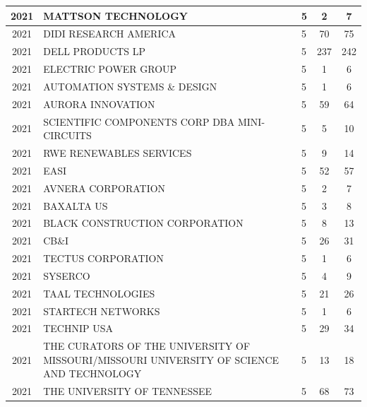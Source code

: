 \documentclass{article}%
\begin{document}
\begin{longtable}{c|p{20em}|p{5em}|c|c}
\hline%
2021&MATTSON TECHNOLOGY&5&2&7\\%
\hline%
2021&DIDI RESEARCH AMERICA&5&70&75\\%
\hline%
2021&DELL PRODUCTS LP&5&237&242\\%
\hline%
2021&ELECTRIC POWER GROUP&5&1&6\\%
\hline%
2021&AUTOMATION SYSTEMS \& DESIGN&5&1&6\\%
\hline%
2021&AURORA INNOVATION&5&59&64\\%
\hline%
2021&SCIENTIFIC COMPONENTS CORP DBA MINI{-}CIRCUITS&5&5&10\\%
\hline%
2021&RWE RENEWABLES SERVICES&5&9&14\\%
\hline%
2021&EASI&5&52&57\\%
\hline%
2021&AVNERA CORPORATION&5&2&7\\%
\hline%
2021&BAXALTA US&5&3&8\\%
\hline%
2021&BLACK CONSTRUCTION CORPORATION&5&8&13\\%
\hline%
2021&CB\&I&5&26&31\\%
\hline%
2021&TECTUS CORPORATION&5&1&6\\%
\hline%
2021&SYSERCO&5&4&9\\%
\hline%
2021&TAAL TECHNOLOGIES&5&21&26\\%
\hline%
2021&STARTECH NETWORKS&5&1&6\\%
\hline%
2021&TECHNIP USA&5&29&34\\%
\hline%
2021&THE CURATORS OF THE UNIVERSITY OF MISSOURI/MISSOURI UNIVERSITY OF SCIENCE AND TECHNOLOGY&5&13&18\\%
\hline%
2021&THE UNIVERSITY OF TENNESSEE&5&68&73\\%
\hline%
\end{longtable}

%
\newpage%
\end{document}
